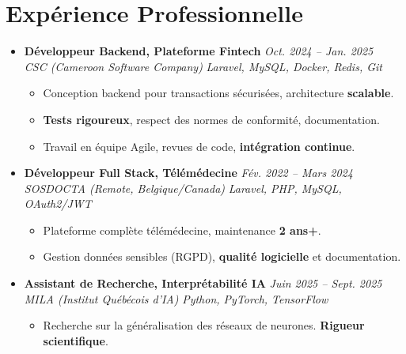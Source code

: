 \documentclass[a4paper,11pt]{article}
\begin{document}
\section{Expérience Professionnelle}
\begin{itemize}[leftmargin=*, label={-}]

\item \textbf{Développeur Backend, Plateforme Fintech} \hfill \textit{Oct. 2024 -- Jan. 2025} \\
\textit{CSC (Cameroon Software Company)} \hfill \textit{Laravel, MySQL, Docker, Redis, Git}
\vspace{-2pt}
    \begin{itemize}[leftmargin=0.4cm, nosep, label=\tiny$\bullet$]
        \item \small{Conception backend pour transactions sécurisées, architecture \textbf{scalable}.}
        \item \small{\textbf{Tests rigoureux}, respect des normes de conformité, documentation.}
        \item \small{Travail en équipe Agile, revues de code, \textbf{intégration continue}.}
    \end{itemize}
\vspace{3pt}

\item \textbf{Développeur Full Stack, Télémédecine} \hfill \textit{Fév. 2022 -- Mars 2024} \\
\textit{SOSDOCTA (Remote, Belgique/Canada)} \hfill \textit{Laravel, PHP, MySQL, OAuth2/JWT}
\vspace{-2pt}
    \begin{itemize}[leftmargin=0.4cm, nosep, label=\tiny$\bullet$]
        \item \small{Plateforme complète télémédecine, maintenance \textbf{2 ans+}.}
        \item \small{Gestion données sensibles (RGPD), \textbf{qualité logicielle} et documentation.}
    \end{itemize}
\vspace{3pt}

\item \textbf{Assistant de Recherche, Interprétabilité IA} \hfill \textit{Juin 2025 -- Sept. 2025} \\
\textit{MILA (Institut Québécois d'IA)} \hfill \textit{Python, PyTorch, TensorFlow}
\vspace{-2pt}
    \begin{itemize}[leftmargin=0.4cm, nosep, label=\tiny$\bullet$]
        \item \small{Recherche sur la généralisation des réseaux de neurones. \textbf{Rigueur scientifique}.}
    \end{itemize}

\end{itemize}
\end{document}

